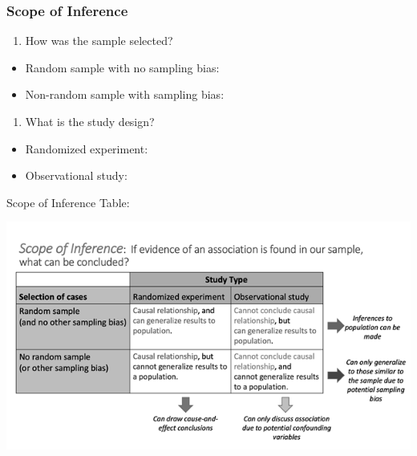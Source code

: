 \documentclass[
]{report}
\providecommand{\tightlist}{%
  \setlength{\itemsep}{0pt}\setlength{\parskip}{0pt}}
\begin{document}
\vspace{0.5in}

\subsubsection*{Scope of Inference}\label{scope-of-inference}

\begin{enumerate}
\def\labelenumi{\arabic{enumi}.}
\tightlist
\item
  How was the sample selected?
\end{enumerate}

\begin{itemize}
\tightlist
\item
  Random sample with no sampling bias:
\end{itemize}

\vspace{0.35in}

\begin{itemize}
\tightlist
\item
  Non-random sample with sampling bias:
\end{itemize}

\vspace{0.35in}

\begin{enumerate}
\def\labelenumi{\arabic{enumi}.}
\setcounter{enumi}{1}
\tightlist
\item
  What is the study design?
\end{enumerate}

\begin{itemize}
\tightlist
\item
  Randomized experiment:
\end{itemize}

\vspace{0.35in}

\begin{itemize}
\tightlist
\item
  Observational study:
\end{itemize}

\vspace{0.35in}

\newpage

Scope of Inference Table:

\begin{center}\includegraphics[width=0.65\linewidth]{images/ScopeOfInferenceGreyscale} \end{center}
\end{document}

